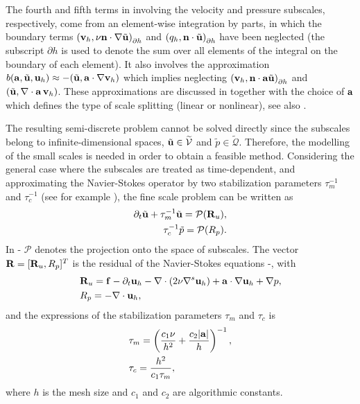 The fourth and fifth terms in  involving the velocity and pressure subscales, respectively, come from an element-wise integration by parts, in which the boundary terms 
$\left( {\bf v}_{h},\nu {\bf n}\cdot \nabla \tilde{{\bf u}}\right)_{\partial h}$ and
$\left( q_{h},{\bf n}\cdot \tilde{{\bf u}}\right)_{\partial h}$
have been neglected (the subscript ${\partial h}$ is used to denote the sum over all elements of the integral on the boundary of each element). It also involves the approximation 
$b({\bf a},\tilde{{\bf u}},{\bf u}_h) \approx -(\tilde{{\bf u}},{\bf a}\cdot\nabla{\bf v}_h)$
which implies neglecting 
$\left( {\bf v}_{h},{\bf n}\cdot {\bf a} \tilde{{\bf u}}\right)_{\partial h}$ and
$(\tilde{{\bf u}},\nabla\cdot{\bf a} \, {\bf v}_h)$. 
These approximations are discussed in  \cite{codina_time_2007} together with the choice of ${\bf a}$ which defines the type of scale splitting (linear or nonlinear), see also \cite{colomes_assessment_2015}.

The resulting semi-discrete problem  cannot be solved directly since the subscales belong to infinite-dimensional spaces, $ \tilde{{\bf u}}\in\widetilde{\mathcal{V}} $ and $ \tilde{p}\in\widetilde{\mathcal{Q}} $. Therefore, the modelling of the small scales is needed in order to obtain a feasible method. Considering the general case where the subscales are treated as time-dependent, and approximating the Navier-Stokes operator by two stabilization parameters $\tau_m^{-1}$ and $\tau_c^{-1}$ (see for example \cite{codina_time_2007}), the fine scale problem can be written as
\begin{align}
\label{eq-C7_velo_sgs}
\partial_t\tilde{{\bf u}}+\tau_m^{-1}\tilde{{\bf u}}=\mathcal{P}({\bf R}_u),\\
\label{eq-C7_press_sgs}
\tau_c^{-1}\tilde{p}=\mathcal{P}(R_p).
\end{align}
In - $\mathcal{P}$ denotes the projection onto the space of subscales. The vector ${\bf R}=[{\bf R}_u,R_p]^T$ is the residual of the Navier-Stokes equations -, with
\begin{align}
\label{eq-C7_Ru}
&{\bf R}_u={\bf f}-\partial_t{\bf u}_h-\nabla\cdot\left(2\nu\nabla^s{\bf u}_h\right)+{\bf a}\cdot\nabla{\bf u}_h+\nabla p,\\
\label{eq-C7_Rp}
&R_p=-\nabla\cdot{\bf u}_h,
\end{align}
and the expressions of the stabilization parameters $\tau_m$ and $\tau_c$ is 
\begin{align}
\label{eq-C7_tau_m}
&\tau_m=\left(\frac{c_1\nu}{h^2}+\frac{c_2|{\bf a}|}{h}\right)^{-1},\\
\label{eq-C7_tau_c}
&\tau_c=\frac{h^2}{c_1\tau_m},
\end{align}
where $h$ is the mesh size and $c_1$ and $c_2$ are algorithmic constants.

